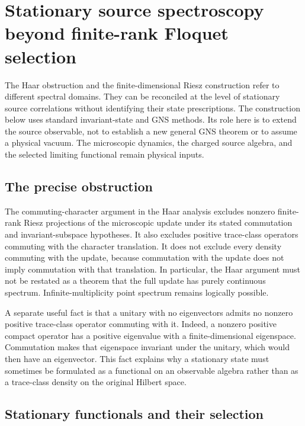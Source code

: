 \section{Stationary source spectroscopy beyond finite-rank Floquet selection}
\label{sec:algebraic-stationary-completion}

The Haar obstruction and the finite-dimensional Riesz construction refer to
different spectral domains. They can be reconciled at the level of stationary
source correlations without identifying their state prescriptions. The
construction below uses standard invariant-state and GNS methods. Its role
here is to extend the source observable, not to establish a new general GNS
theorem or to assume a physical vacuum. The microscopic dynamics, the charged
source algebra, and the selected limiting functional remain physical inputs.

\subsection{The precise obstruction}

The commuting-character argument in the Haar analysis excludes nonzero
finite-rank Riesz projections of the microscopic update under its stated
commutation and invariant-subspace hypotheses. It also excludes positive
trace-class operators commuting with the character translation. It does not
exclude every density commuting with the update, because commutation with the
update does not imply commutation with that translation. In particular, the
Haar argument must not be restated as a theorem that the full update has purely
continuous spectrum. Infinite-multiplicity point spectrum remains logically
possible.

A separate useful fact is that a unitary with no eigenvectors admits no
nonzero positive trace-class operator commuting with it. Indeed, a nonzero
positive compact operator has a positive eigenvalue with a finite-dimensional
eigenspace. Commutation makes that eigenspace invariant under the unitary,
which would then have an eigenvector. This fact explains why a stationary
state must sometimes be formulated as a functional on an observable algebra
rather than as a trace-class density on the original Hilbert space.

\subsection{Stationary functionals and their selection}


